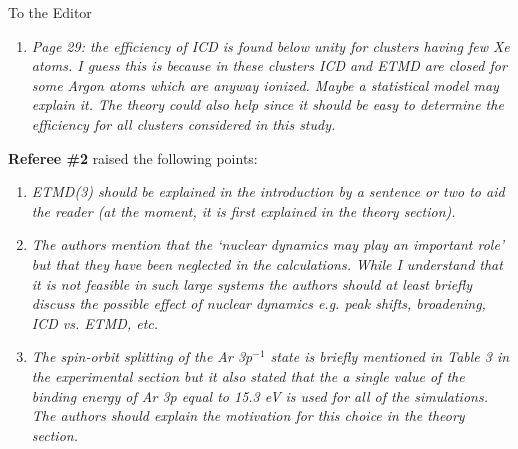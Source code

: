\documentclass[DIN,pagenumber=false,parskip=half,fromalign=left,fromphone=true,fromemail=true,fromurl=false,fromlogo=false,fromrule=false]{scrlttr2}
\begin{document}
\begin{letter}{To the Editor}
\begin{enumerate}
        $R$ being the distance between the electron transfer unit and the xenon
        atom ionized in the final state.
        The larger the distance between the xenon atoms, the higher are the
        energies of the secondary electrons{\color{blue}{. For the case of xenon
        atoms on argon surfaces this at the same time means a larger distance
        between the Ar-Xe pair involved in the electron transfer and the
        electron emitting xenon atom. Hence, the decay widths are smaller.}}
        Therefore, a
        significant contribution from ETMD(3) compared to ICD is only
        seen if the two xenon atoms reside on two adjacent
        surfaces. 

  \item \emph{Page 29:
        the efficiency of ICD is found below unity for clusters having few Xe atoms. I guess this is because in these clusters ICD and ETMD are closed for some Argon atoms which are anyway ionized. Maybe a statistical model may explain it. The theory could also help since it should be easy to determine the efficiency for all clusters considered in this study.}


\end{enumerate}

\textbf{Referee \#2} raised the following points:

\begin{enumerate}
 \item \emph{ETMD(3) should be explained in the introduction by a sentence or two to aid the reader (at the moment, it is first explained in the theory section).
}
 \item \emph{The authors mention that the ‘nuclear dynamics may play an important role’ but that they have been neglected in the calculations. While I understand that it is not feasible in such large systems the authors should at least briefly discuss the possible effect of nuclear dynamics e.g. peak shifts, broadening, ICD vs. ETMD, etc. }

 \item \emph{The spin-orbit splitting of the Ar 3p$^{-1}$ state is briefly mentioned in Table 3 in the experimental section but it also stated that the a single value of the binding energy of Ar 3p equal to 15.3 eV is used for all of the simulations. The authors should explain the motivation for this choice in the theory section.}


\end{enumerate}
\end{letter}
\end{document}
